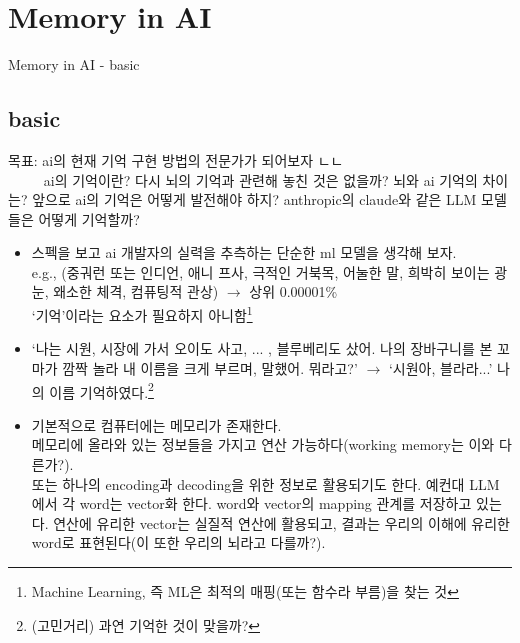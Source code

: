\documentclass{beamer}
\begin{document}
\section{Memory in AI}
\begin{frame}{Memory in AI - basic}
  \subsection{basic}
  목표: ai의 현재 기억 구현 방법의 전문가가 되어보자 ㄴㄴ\\
  $\;\;\;\;\;\;\;\;$ ai의 기억이란? 다시 뇌의 기억과 관련해 놓친 것은 없을까? 뇌와 ai 기억의 차이는? 앞으로 ai의 기억은 어떻게 발전해야 하지?
  anthropic의 claude와 같은 LLM 모델들은 어떻게 기억할까?
  \begin{itemize}
    \item 스펙을 보고 ai 개발자의 실력을 추측하는 단순한 ml 모델을 생각해 보자.\\
      e.g., (중궈런 또는 인디언, 애니 프사, 극적인 거북목, 어눌한 말, 희박히 보이는 광눈, 왜소한 체격, 컴퓨팅적 관상) $\longrightarrow$ 상위 0.00001\%\\
      `기억'이라는 요소가 필요하지 아니함\footnote{Machine Learning, 즉 ML은 최적의 매핑(또는 함수라 부름)을 찾는 것}
    \item `나는 시원, 시장에 가서 오이도 사고, ... , 블루베리도 샀어. 나의 장바구니를 본 꼬마가 깜짝 놀라 내 이름을 크게 부르며, 말했어. 뭐라고?'
      $\rightarrow$ `시원아, 블라라...' 나의 이름 기억하였다.\footnote{(고민거리) 과연 기억한 것이 맞을까?}
    \item 기본적으로 컴퓨터에는 메모리가 존재한다.\\
      메모리에 올라와 있는 정보들을 가지고 연산 가능하다(working memory는 이와 다른가?).\\
      또는 하나의 encoding과 decoding을 위한 정보로 활용되기도 한다. 예컨대 LLM에서 각 word는 vector화 한다. word와 vector의 mapping 관계를 저장하고 있는다.
      연산에 유리한 vector는 실질적 연산에 활용되고, 결과는 우리의 이해에 유리한 word로 표현된다(이 또한 우리의 뇌라고 다를까?).
  \end{itemize}
\end{frame}
\end{document}
